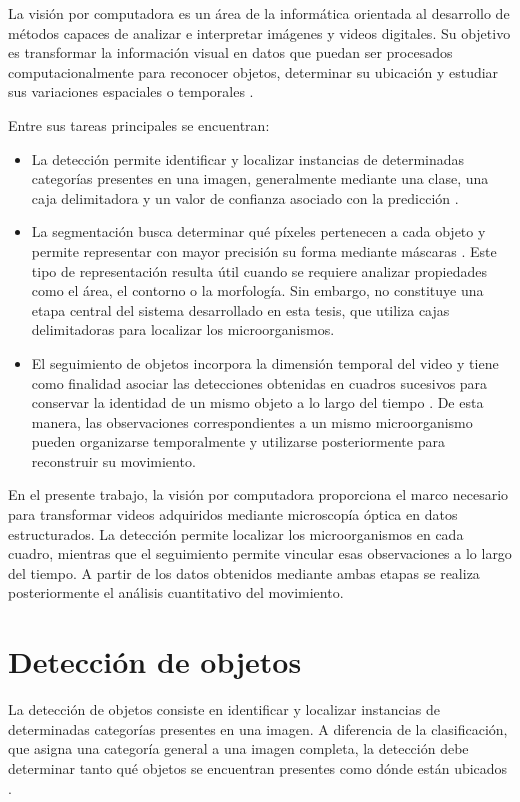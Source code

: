 La visión por computadora es un área de la informática orientada al desarrollo de métodos capaces de analizar e interpretar imágenes y videos digitales. Su objetivo es transformar la información visual en datos que puedan ser procesados computacionalmente para reconocer objetos, determinar su ubicación y estudiar sus variaciones espaciales o temporales \cite{szeliski2022}.

Entre sus tareas principales se encuentran:

\begin{itemize}
  \item La detección permite identificar y localizar instancias de determinadas categorías presentes en una imagen, generalmente mediante una clase, una caja delimitadora y un valor de confianza asociado con la predicción \cite{ren2015}.
  \item La segmentación busca determinar qué píxeles pertenecen a cada objeto y permite representar con mayor precisión su forma mediante máscaras \cite{he2017}. Este tipo de representación resulta útil cuando se requiere analizar propiedades como el área, el contorno o la morfología. Sin embargo, no constituye una etapa central del sistema desarrollado en esta tesis, que utiliza cajas delimitadoras para localizar los microorganismos.
  \item El seguimiento de objetos incorpora la dimensión temporal del video y tiene como finalidad asociar las detecciones obtenidas en cuadros sucesivos para conservar la identidad de un mismo objeto a lo largo del tiempo \cite{bewley2016}. De esta manera, las observaciones correspondientes a un mismo microorganismo pueden organizarse temporalmente y utilizarse posteriormente para reconstruir su movimiento.
\end{itemize}

En el presente trabajo, la visión por computadora proporciona el marco necesario para transformar videos adquiridos mediante microscopía óptica en datos estructurados. La detección permite localizar los microorganismos en cada cuadro, mientras que el seguimiento permite vincular esas observaciones a lo largo del tiempo. A partir de los datos obtenidos mediante ambas etapas se realiza posteriormente el análisis cuantitativo del movimiento.

\section{Detección de objetos}

La detección de objetos consiste en identificar y localizar instancias de determinadas categorías presentes en una imagen. A diferencia de la clasificación, que asigna una categoría general a una imagen completa, la detección debe determinar tanto qué objetos se encuentran presentes como dónde están ubicados \cite{redmon2016}.

